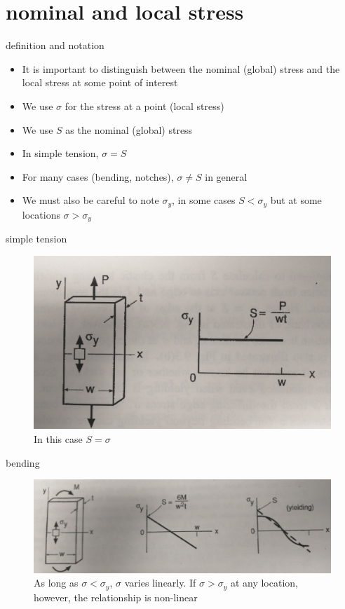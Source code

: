 \documentclass[10pt]{beamer}
\begin{document}
\section{nominal and local stress}

\begin{frame}{definition and notation}
	\begin{itemize}[<+->]
		\item It is important to distinguish between the nominal (global) stress and the local stress at some point of interest
		\item We use $\sigma$ for the stress at a point (local stress)
		\item We use $S$ as the nominal (global) stress
		\item In simple tension, $\sigma = S$ 
		\item For many cases (bending, notches), $\sigma \ne S$ in general
		\item We must also be careful to note $\sigma_y$, in some cases $S < \sigma_y$ but at some locations $\sigma > \sigma_y$
	\end{itemize}
\end{frame}

\begin{frame}{simple tension}
	\begin{figure}
	\centering
	\includegraphics[width=0.7\linewidth]{../Figures/p232-a}
	\caption{In this case $S = \sigma$}
	\label{fig:p232-a}
	\end{figure}
\end{frame}

\begin{frame}{bending}
	\begin{figure}
	\centering
	\includegraphics[width=0.7\linewidth]{../Figures/p232-b}
	\caption{As long as $\sigma < \sigma_y$, $\sigma$ varies linearly. If $\sigma > \sigma_y$ at any location, however, the relationship is non-linear}
	\label{fig:p232-b}
	\end{figure}
\end{frame}
\end{document}
